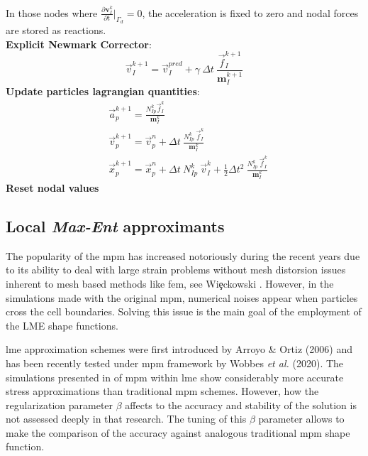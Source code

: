 \documentclass[preprint,12pt,a4paper]{elsarticle}
\newcommand{\vect}[1]{
  \ensuremath{\mathbf{{#1}}}
}
\newcommand{\tens}[1]{
  \ensuremath{\mathbf{{#1}}}
}
\newcommand{\Deriv}[3][]{
  \ensuremath{\frac{\partial^{#1}{#2}}{ \partial {#3}^{#1} }}
}
\begin{document}
\begin{algorithm}
\begin{algorithmic}[1]
    In those nodes where $\Deriv{\vect{v}_I^{k}}{t} \big\rvert_{\Gamma_d} = 0$,
      the acceleration is fixed to zero and nodal forces are stored as
      reactions.\\
    \STATE \textbf{Explicit Newmark Corrector}:
    \begin{equation*}
      \vec{v}_{I}^{k+1} = \vec{v}_{I}^{pred} + \gamma\ \Delta t\ \frac{\vec{f}_{I}^{k+1}}{\tens{m}_I^{k+1}}  
    \end{equation*}
    \STATE \textbf{Update particles lagrangian quantities}:
    \begin{align*}
      &\vec{a}_p^{k+1} = \frac{N_{Ip}^k\vec{f}_{I}^{k}}{\tens{m}_I^k}\\
      &\vec{v}_p^{k+1} = \vec{v}_p^n + \Delta t\
        \frac{N_{Ip}^k\
        \vec{f}_{I}^{k}}{\tens{m}_I^k}\\
      &\vec{x}_p^{k+1} = \vec{x}_p^n + \Delta t\
         N_{Ip}^k\ \vec{v}_{I}^{k} +
        \frac{1}{2}\Delta t^2\ \frac{N_{Ip}^k\
        \vec{f}_{I}^{k}}{\tens{m}_I^k}
    \end{align*}
    \STATE \textbf{Reset nodal values}
  \end{algorithmic}
\end{algorithm}

\subsection{Local \textit{Max-Ent} approximants}
\label{sec:local-max-ent}
The popularity of the \acrshort{mpm} has increased notoriously during
the recent years due to its ability to deal with large strain problems
without mesh distorsion issues inherent to mesh based methods like
\acrshort{fem}, see Wi{\c{e}}ckowski \cite{Wieckowski2004}. However, in the simulations
made with the original \acrshort{mpm}, numerical noises appear when particles
cross the cell boundaries. Solving this issue is the main goal of the employment of the \acrshort{LME} shape functions.

\acrfull{lme} approximation schemes were
first introduced by Arroyo \& Ortiz (2006)\cite{Arroyo2006} and has been
recently tested under \acrshort{mpm} framework by Wobbes {\it et al.}
(2020)\cite{Wobbes2020}. The simulations presented in \cite{Wobbes2020} of \acrshort{mpm}
within \acrshort{lme} show considerably more accurate stress
approximations than traditional \acrshort{mpm} schemes. However, 
how the regularization parameter $\beta$ affects to the accuracy and
stability of the solution is not assessed deeply in that research. The tuning of this $\beta$ parameter allows to make the comparison of the accuracy against analogous traditional \acrshort{mpm} shape function.
\end{document}
